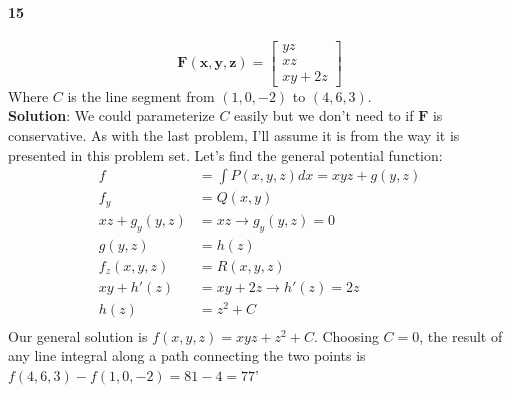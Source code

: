 \documentclass{article}
\begin{document}
    \paragraph{15}
    \[
        \mathbf{F(x,y,z)} = \begin{bmatrix} yz \\ xz \\ xy+2z \end{bmatrix}
    \]
    Where $C$ is the line segment from $(1,0,-2)$ to $(4,6,3)$.\\
    \textbf{Solution}: We could parameterize $C$ easily but we don't need to if $\mathbf{F}$ is conservative. As with
    the last problem, I'll assume it is from the way it is presented in this problem set. Let's find the general potential function:
    \begin{align*}
        f &= \int P(x,y,z)dx = xyz + g(y,z) \\
        f_y &= Q(x,y) \\
        xz + g_y(y,z) &= xz \rightarrow g_y(y,z) = 0 \\
        g(y,z) &= h(z)\\
        f_z(x,y,z) &= R(x,y,z)\\
        xy + h'(z) &= xy + 2z \rightarrow h'(z) = 2z \\
        h(z) &= z^2 + C\\
    \end{align*}
    Our general solution is $f(x,y,z) = xyz + z^2 + C$. Choosing $C=0$, the result of any line integral along a path connecting the
    two points is $f(4,6,3)-f(1,0,-2)=81-4=77$'
\end{document}
